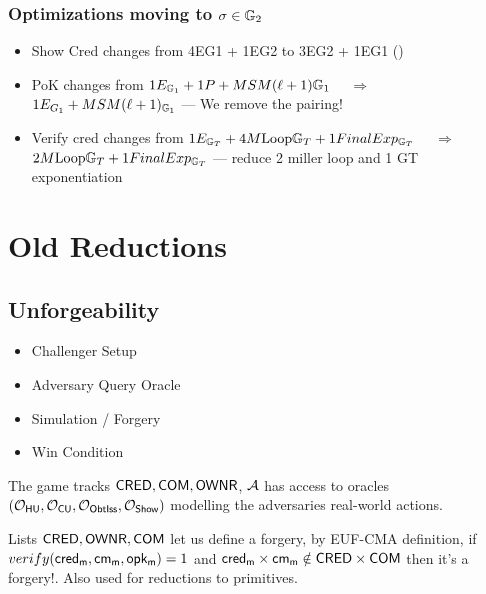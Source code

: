 \subsubsection{Optimizations moving to $\sigma \in \mathbb{G}_2$}
\begin{itemize}
    \item Show Cred changes from 4EG1 + 1EG2 to 3EG2 + 1EG1 ()
    \item PoK changes from $1E_{\mathbb{G}_1} + 1P + MSM(\ell + 1)\mathbb{G}_1$ $\quad \Rightarrow \quad$ $ 1E_{G_1} +MSM(\ell + 1)_{\mathbb{G}_1}$ --- We remove the pairing!
    \item Verify cred changes from $1E_{\mathbb{G}_T} + 4M\text{Loop}\mathbb{G}_T + 1FinalExp_{\mathbb{G}_T}$ $\quad \Rightarrow \quad$ $2M\text{Loop}\mathbb{G}_T + 1FinalExp_{\mathbb{G}_T}$ --- reduce 2 miller loop and 1 GT exponentiation
\end{itemize}
























\section{Old Reductions}
\subsection{Unforgeability}
\begin{itemize}
    \item Challenger Setup
    \item Adversary Query Oracle
    \item Simulation / Forgery
    \item Win Condition
\end{itemize}
The game tracks $\mathsf{CRED}, \mathsf{COM}, \mathsf{OWNR}$, $\mathcal{A}$ has access to oracles $(\mathcal{O}_{\mathsf{HU}}, \mathcal{O}_{\mathsf{CU}}, \mathcal{O}_{\mathsf{ObtIss}}, \mathcal{O}_{\mathsf{Show}})$ modelling the adversaries real-world actions. 

Lists $\mathsf{CRED}, \mathsf{OWNR}, \mathsf{COM}$ let us define a forgery, by EUF-CMA definition, if $verify(\mathsf{cred_m}, \mathsf{cm_m}, \mathsf{opk_m}) = 1$ and $\mathsf{cred_m} \times \mathsf{cm_m} \notin \mathsf{CRED} \times \mathsf{COM}$ then it's a forgery!. Also used for reductions to primitives.

